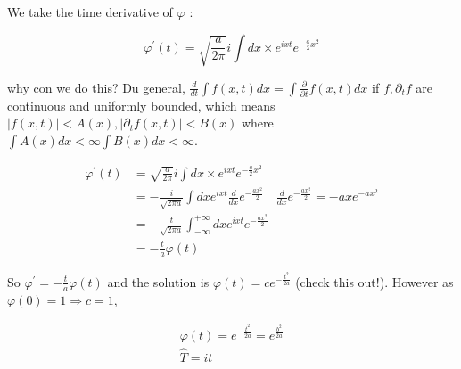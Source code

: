 We take the time derivative of $\varphi$ :

$$ 
\varphi^{\prime}(t)=\sqrt{\frac{a}{2 \pi}} i \int d x \times e^{i x t} e^{-\frac{a}{2} x^{2}}
$$ 

why con we do this? Du general, $\frac{d}{d t} \int f(x, t) d x=\int \frac{\partial}{\partial t} f(x, t) d x$ if $f, \partial_{t} f$ are continuous and uniformly bounded, which means $|f(x, t)|<A(x),\left|\partial_{t} f(x, t)\right|<B(x)$ where $\int A(x) d x<\infty \int B(x) d x<\infty$.

$$ 
\begin{aligned}
\varphi^{\prime}(t) & =\sqrt{\frac{a}{2 \pi}} i \int d x \times e^{i x t} e^{-\frac{a}{2} x^{2}} \\
& =-\frac{i}{\sqrt{2 \pi a}} \int d x e^{i x t} \frac{d}{d x} e^{-\frac{a x^{2}}{2}} \quad \frac{d}{d x} e^{-\frac{a x^{2}}{2}}=-a x e^{-a x^{2}} \\
& =-\frac{t}{\sqrt{2 \pi a}} \int_{-\infty}^{+\infty} d x e^{i x t} e^{-\frac{a x^{2}}{2}} \\
& =-\frac{t}{a} \varphi(t)
\end{aligned}
$$ 

So \quad $\varphi^{\prime}=-\frac{t}{a} \varphi(t)$ and the solution is $\varphi(t)=c e^{-\frac{t^{2}}{2 a}}$ (check this out!). However as $\varphi(0)=1 \Rightarrow c=1$,

$$ 
\begin{gathered}
\varphi(t)=e^{-\frac{t^{2}}{2 a}}=e^{\frac{b^{2}}{2 a}} \\
\hat{T}=i t
\end{gathered}
$$
